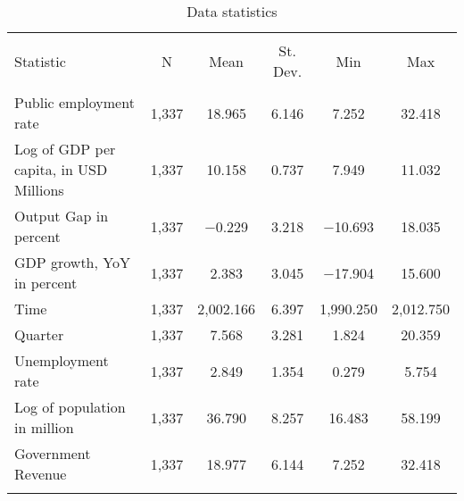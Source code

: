 
\begin{table}[!htbp] \centering 
  \caption{Data statistics} 
  \label{} 
\footnotesize 
\begin{tabular}{@{\extracolsep{5pt}}lccccc} 
\\[-1.8ex]\hline 
\hline \\[-1.8ex] 
Statistic & \multicolumn{1}{c}{N} & \multicolumn{1}{c}{Mean} & \multicolumn{1}{c}{St. Dev.} & \multicolumn{1}{c}{Min} & \multicolumn{1}{c}{Max} \\ 
\hline \\[-1.8ex] 
Public employment rate & 1,337 & 18.965 & 6.146 & 7.252 & 32.418 \\ 
Log of GDP per capita, in USD Millions & 1,337 & 10.158 & 0.737 & 7.949 & 11.032 \\ 
Output Gap in percent & 1,337 & $-$0.229 & 3.218 & $-$10.693 & 18.035 \\ 
GDP growth, YoY in percent & 1,337 & 2.383 & 3.045 & $-$17.904 & 15.600 \\ 
Time & 1,337 & 2,002.166 & 6.397 & 1,990.250 & 2,012.750 \\ 
Quarter & 1,337 & 7.568 & 3.281 & 1.824 & 20.359 \\ 
Unemployment rate & 1,337 & 2.849 & 1.354 & 0.279 & 5.754 \\ 
Log of population in million & 1,337 & 36.790 & 8.257 & 16.483 & 58.199 \\ 
Government Revenue & 1,337 & 18.977 & 6.144 & 7.252 & 32.418 \\ 
\hline \\[-1.8ex] 
\end{tabular} 
\end{table} 
